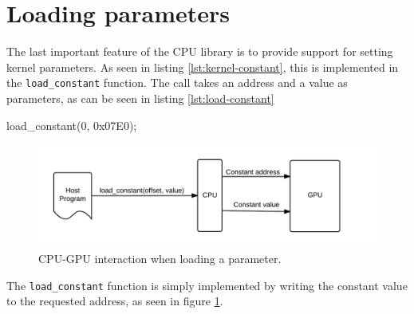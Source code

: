 \section{Loading parameters}
The last important feature of the CPU library is to provide support for setting kernel parameters.
As seen in listing \ref{lst:kernel-constant}, this is implemented in the \verb/load_constant/ function.
The call takes an address and a value as parameters, as can be seen in listing \ref{lst:load-constant}

\begin{c-code}[caption=Setting a kernel parameter, label=lst:load-constant]
load_constant(0, 0x07E0);
\end{c-code}

\begin{figure}[H]
    \centering
    \includegraphics[width=\textwidth]{../cpu/diagrams/loading_a_constant.png}
    \caption{CPU-GPU interaction when loading a parameter.}
    \label{fig:loading_a_constant}
\end{figure}

The \verb/load_constant/ function is simply implemented by writing the constant value to the requested address, as seen in figure \ref{fig:loading_a_constant}.
